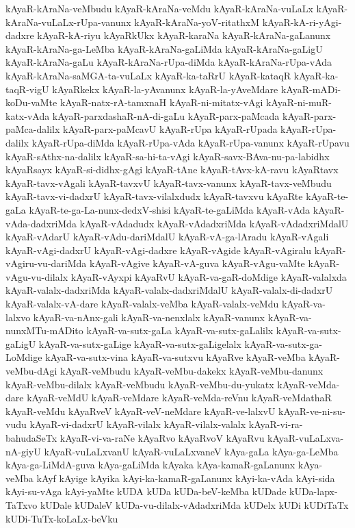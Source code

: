 {kAyaR-kAraNa-veMbudu
kAyaR-kAraNa-veMdu
kAyaR-kAraNa-vuLaLx
kAyaR-kAraNa-vuLaLx-rUpa-vanunx
kAyaR-kAraNa-yoV-ritathxM
kAyaR-kA-ri-yAgi-dadxre
kAyaR-kA-riyu
kAyaRkUkx
kAyaR-karaNa
kAyaR-kAraNa-gaLanunx
kAyaR-kAraNa-ga-LeMba
kAyaR-kAraNa-gaLiMda
kAyaR-kAraNa-gaLigU
kAyaR-kAraNa-gaLu
kAyaR-kAraNa-rUpa-diMda
kAyaR-kAraNa-rUpa-vAda
kAyaR-kAraNa-saMGA-ta-vuLaLx
kAyaR-ka-taRrU
kAyaR-kataqR
kAyaR-ka-taqR-vigU
kAyaRkekx
kAyaR-la-yAvanunx
kAyaR-la-yAveMdare
kAyaR-mADi-koDu-vaMte
kAyaR-natx-rA-tamxnaH
kAyaR-ni-mitatx-vAgi
kAyaR-ni-muR-katx-vAda
kAyaR-parxdashaR-nA-di-gaLu
kAyaR-parx-paMcada
kAyaR-parx-paMca-dalilx
kAyaR-parx-paMcavU
kAyaR-rUpa
kAyaR-rUpada
kAyaR-rUpa-dalilx
kAyaR-rUpa-diMda
kAyaR-rUpa-vAda
kAyaR-rUpa-vanunx
kAyaR-rUpavu
kAyaR-sAthx-na-dalilx
kAyaR-sa-hi-ta-vAgi
kAyaR-savx-BAva-nu-pa-labidhx
kAyaRsayx
kAyaR-si-didhx-gAgi
kAyaR-tAne
kAyaR-tAvx-kA-ravu
kAyaRtavx
kAyaR-tavx-vAgali
kAyaR-tavxvU
kAyaR-tavx-vanunx
kAyaR-tavx-veMbudu
kAyaR-tavx-vi-dadxrU
kAyaR-tavx-vilalxdudx
kAyaR-tavxvu
kAyaRte
kAyaR-te-gaLa
kAyaR-te-ga-La-nunx-dedxV-shisi
kAyaR-te-gaLiMda
kAyaR-vAda
kAyaR-vAda-dadxriMda
kAyaR-vAdadudx
kAyaR-vAdadxriMda
kAyaR-vAdadxriMdalU
kAyaR-vAdarU
kAyaR-vAdu-dariMdalU
kAyaR-vA-ga-lAradu
kAyaR-vAgali
kAyaR-vAgi-dadxrU
kAyaR-vAgi-dadxre
kAyaR-vAgide
kAyaR-vAgiralu
kAyaR-vAgiru-vu-dariMda
kAyaR-vAgive
kAyaR-vA-guva
kAyaR-vAgu-vaMte
kAyaR-vAgu-vu-dilalx
kAyaR-vAyxpi
kAyaRvU
kAyaR-va-gaR-doMdige
kAyaR-valalxda
kAyaR-valalx-dadxriMda
kAyaR-valalx-dadxriMdalU
kAyaR-valalx-di-dadxrU
kAyaR-valalx-vA-dare
kAyaR-valalx-veMba
kAyaR-valalx-veMdu
kAyaR-va-lalxvo
kAyaR-va-nAnx-gali
kAyaR-va-nenxlalx
kAyaR-vanunx
kAyaR-va-nunxMTu-mADito
kAyaR-va-sutx-gaLa
kAyaR-va-sutx-gaLalilx
kAyaR-va-sutx-gaLigU
kAyaR-va-sutx-gaLige
kAyaR-va-sutx-gaLigelalx
kAyaR-va-sutx-ga-LoMdige
kAyaR-va-sutx-vina
kAyaR-va-sutxvu
kAyaRve
kAyaR-veMba
kAyaR-veMbu-dAgi
kAyaR-veMbudu
kAyaR-veMbu-dakekx
kAyaR-veMbu-danunx
kAyaR-veMbu-dilalx
kAyaR-veMbudu
kAyaR-veMbu-du-yukatx
kAyaR-veMda-dare
kAyaR-veMdU
kAyaR-veMdare
kAyaR-veMda-reVnu
kAyaR-veMdathaR
kAyaR-veMdu
kAyaRveV
kAyaR-veV-neMdare
kAyaR-ve-lalxvU
kAyaR-ve-ni-su-vudu
kAyaR-vi-dadxrU
kAyaR-vilalx
kAyaR-vilalx-valalx
kAyaR-vi-ra-bahudaSeTx
kAyaR-vi-va-raNe
kAyaRvo
kAyaRvoV
kAyaRvu
kAyaR-vuLaLxva-nA-giyU
kAyaR-vuLaLxvanU
kAyaR-vuLaLxvaneV
kAya-gaLa
kAya-ga-LeMba
kAya-ga-LiMdA-guva
kAya-gaLiMda
kAyaka
kAya-kamaR-gaLanunx
kAya-veMba
kAyf
kAyige
kAyika
kAyi-ka-kamaR-gaLanunx
kAyi-ka-vAda
kAyi-sida
kAyi-su-vAga
kAyi-yaMte
kUDA
kUDa
kUDa-beV-keMba
kUDade
kUDa-lapx-TaTxvo
kUDale
kUDaleV
kUDa-vu-dilalx-vAdadxriMda
kUDelx
kUDi
kUDiTaTx
kUDi-TuTx-koLaLx-beVku
}
